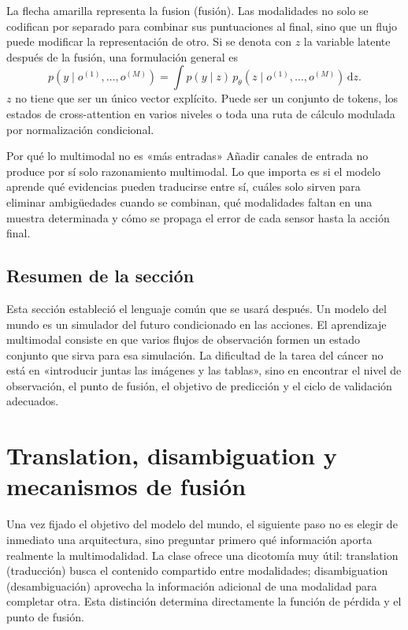 \documentclass[a4paper]{article}
\begin{document}
La flecha amarilla representa la fusion (fusión). Las modalidades no solo se codifican por separado para combinar sus puntuaciones al final, sino que un flujo puede modificar la representación de otro. Si se denota con $z$ la variable latente después de la fusión, una formulación general es
\[
p(y\mid o^{(1)},\ldots,o^{(M)})
=\int p(y\mid z)\,p_\theta(z\mid o^{(1)},\ldots,o^{(M)})\,\mathrm{d}z.
\]
$z$ no tiene que ser un único vector explícito. Puede ser un conjunto de tokens, los estados de cross-attention en varios niveles o toda una ruta de cálculo modulada por normalización condicional.

\begin{knowledgebox}{Por qué lo multimodal no es «más entradas»}
Añadir canales de entrada no produce por sí solo razonamiento multimodal. Lo que importa es si el modelo aprende qué evidencias pueden traducirse entre sí, cuáles solo sirven para eliminar ambigüedades cuando se combinan, qué modalidades faltan en una muestra determinada y cómo se propaga el error de cada sensor hasta la acción final.
\end{knowledgebox}

\subsection{Resumen de la sección}

Esta sección estableció el lenguaje común que se usará después. Un modelo del mundo es un simulador del futuro condicionado en las acciones. El aprendizaje multimodal consiste en que varios flujos de observación formen un estado conjunto que sirva para esa simulación. La dificultad de la tarea del cáncer no está en «introducir juntas las imágenes y las tablas», sino en encontrar el nivel de observación, el punto de fusión, el objetivo de predicción y el ciclo de validación adecuados.
\section{Translation, disambiguation y mecanismos de fusión}

Una vez fijado el objetivo del modelo del mundo, el siguiente paso no es elegir de inmediato una arquitectura, sino preguntar primero qué información aporta realmente la multimodalidad. La clase ofrece una dicotomía muy útil: translation (traducción) busca el contenido compartido entre modalidades; disambiguation (desambiguación) aprovecha la información adicional de una modalidad para completar otra. Esta distinción determina directamente la función de pérdida y el punto de fusión.
\end{document}
